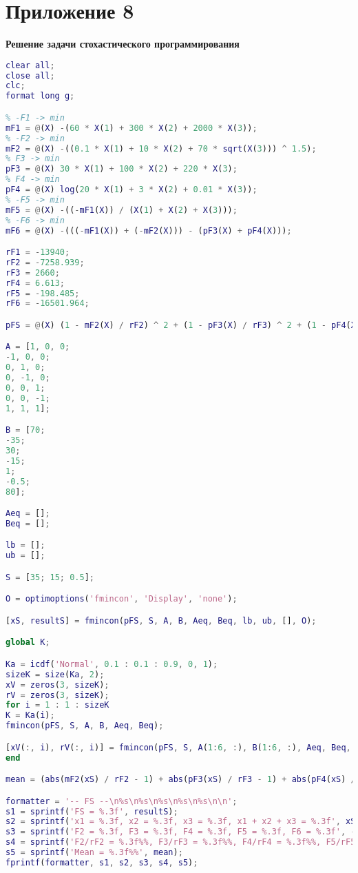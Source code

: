 \section*{Приложение 8} \label{p1:8}
\textbf{Решение задачи стохастического программирования}
\begin{lstlisting}[language={matlab}, caption={Решение задачи стохастического программирования}, label={lst:0}, basicstyle={\footnotesize\ttfamily}, breaklines={true}]
clear all;
close all; 
clc;
format long g;

% -F1 -> min
mF1 = @(X) -(60 * X(1) + 300 * X(2) + 2000 * X(3));
% -F2 -> min
mF2 = @(X) -((0.1 * X(1) + 10 * X(2) + 70 * sqrt(X(3))) ^ 1.5);
% F3 -> min
pF3 = @(X) 30 * X(1) + 100 * X(2) + 220 * X(3);
% F4 -> min
pF4 = @(X) log(20 * X(1) + 3 * X(2) + 0.01 * X(3));
% -F5 -> min
mF5 = @(X) -((-mF1(X)) / (X(1) + X(2) + X(3)));
% -F6 -> min
mF6 = @(X) -(((-mF1(X)) + (-mF2(X))) - (pF3(X) + pF4(X)));

rF1 = -13940;
rF2 = -7258.939;
rF3 = 2660;
rF4 = 6.613;
rF5 = -198.485;
rF6 = -16501.964;

pFS = @(X) (1 - mF2(X) / rF2) ^ 2 + (1 - pF3(X) / rF3) ^ 2 + (1 - pF4(X) / rF4) ^ 2 + (1 - mF5(X) / rF5) ^ 2 + (1 - mF6(X) / rF6) ^ 2;

A = [1, 0, 0;
-1, 0, 0;
0, 1, 0;
0, -1, 0;
0, 0, 1;
0, 0, -1;
1, 1, 1];

B = [70;
-35;
30;
-15;
1;
-0.5;
80];

Aeq = [];
Beq = [];

lb = [];
ub = [];

S = [35; 15; 0.5];

O = optimoptions('fmincon', 'Display', 'none');

[xS, resultS] = fmincon(pFS, S, A, B, Aeq, Beq, lb, ub, [], O);

global K;

Ka = icdf('Normal', 0.1 : 0.1 : 0.9, 0, 1);
sizeK = size(Ka, 2);
xV = zeros(3, sizeK);
rV = zeros(3, sizeK);
for i = 1 : 1 : sizeK
K = Ka(i);
fmincon(pFS, S, A, B, Aeq, Beq);

[xV(:, i), rV(:, i)] = fmincon(pFS, S, A(1:6, :), B(1:6, :), Aeq, Beq, lb, ub, @m8f, O);
end

mean = (abs(mF2(xS) / rF2 - 1) + abs(pF3(xS) / rF3 - 1) + abs(pF4(xS) / rF4 - 1) + abs(mF5(xS) / rF5 - 1) + abs(mF6(xS) / rF6 - 1)) / 5 * 100;

formatter = '-- FS --\n%s\n%s\n%s\n%s\n%s\n\n';
s1 = sprintf('FS = %.3f', resultS);
s2 = sprintf('x1 = %.3f, x2 = %.3f, x3 = %.3f, x1 + x2 + x3 = %.3f', xS, sum(xS));
s3 = sprintf('F2 = %.3f, F3 = %.3f, F4 = %.3f, F5 = %.3f, F6 = %.3f', -mF2(xS), pF3(xS), pF4(xS), -mF5(xS), -mF6(xS));
s4 = sprintf('F2/rF2 = %.3f%%, F3/rF3 = %.3f%%, F4/rF4 = %.3f%%, F5/rF5 = %.3f%%, F6/rF6 = %.3f%%', mF2(xS) / rF2 * 100, pF3(xS) / rF3 * 100, pF4(xS) / rF4 * 100, mF5(xS) / rF5 * 100, mF6(xS) / rF6 * 100);
s5 = sprintf('Mean = %.3f%%', mean);
fprintf(formatter, s1, s2, s3, s4, s5);


\end{lstlisting}
